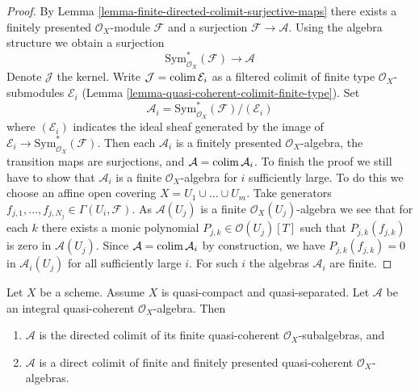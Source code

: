 \begin{proof}
By Lemma \ref{lemma-finite-directed-colimit-surjective-maps}
there exists a finitely presented $\mathcal{O}_X$-module
$\mathcal{F}$ and a surjection $\mathcal{F} \to \mathcal{A}$.
Using the algebra structure we obtain a surjection
$$
\text{Sym}^*_{\mathcal{O}_X}(\mathcal{F}) \longrightarrow \mathcal{A}
$$
Denote $\mathcal{J}$ the kernel. Write $\mathcal{J} = \mathop{\mathrm{colim}}\nolimits \mathcal{E}_i$
as a filtered colimit of finite type $\mathcal{O}_X$-submodules
$\mathcal{E}_i$ (Lemma \ref{lemma-quasi-coherent-colimit-finite-type}). Set
$$
\mathcal{A}_i = \text{Sym}^*_{\mathcal{O}_X}(\mathcal{F})/(\mathcal{E}_i)
$$
where $(\mathcal{E}_i)$ indicates the ideal sheaf generated by
the image of $\mathcal{E}_i \to \text{Sym}^*_{\mathcal{O}_X}(\mathcal{F})$.
Then each $\mathcal{A}_i$ is a finitely presented $\mathcal{O}_X$-algebra,
the transition maps are surjections,
and $\mathcal{A} = \mathop{\mathrm{colim}}\nolimits \mathcal{A}_i$. To finish the proof we still
have to show that $\mathcal{A}_i$ is a finite $\mathcal{O}_X$-algebra
for $i$ sufficiently large. To do this we choose an affine open
covering $X = U_1 \cup \ldots \cup U_m$. Take generators
$f_{j, 1}, \ldots, f_{j, N_j} \in \Gamma(U_i, \mathcal{F})$.
As $\mathcal{A}(U_j)$ is a finite $\mathcal{O}_X(U_j)$-algebra we
see that for each $k$ there exists a monic polynomial
$P_{j, k} \in \mathcal{O}(U_j)[T]$ such that $P_{j, k}(f_{j, k})$
is zero in $\mathcal{A}(U_j)$. Since
$\mathcal{A} = \mathop{\mathrm{colim}}\nolimits \mathcal{A}_i$ by construction, we
have $P_{j, k}(f_{j, k}) = 0$ in $\mathcal{A}_i(U_j)$
for all sufficiently large $i$. For such $i$ the algebras
$\mathcal{A}_i$ are finite.
\end{proof}

\begin{lemma}
\label{lemma-integral-algebra-directed-colimit-finite}
Let $X$ be a scheme. Assume $X$ is quasi-compact and quasi-separated.
Let $\mathcal{A}$ be an integral quasi-coherent $\mathcal{O}_X$-algebra.
Then
\begin{enumerate}
\item $\mathcal{A}$ is the directed colimit of its finite
quasi-coherent $\mathcal{O}_X$-subalgebras, and
\item $\mathcal{A}$ is a direct colimit of finite and finitely
presented quasi-coherent $\mathcal{O}_X$-algebras.
\end{enumerate}
\end{lemma}

